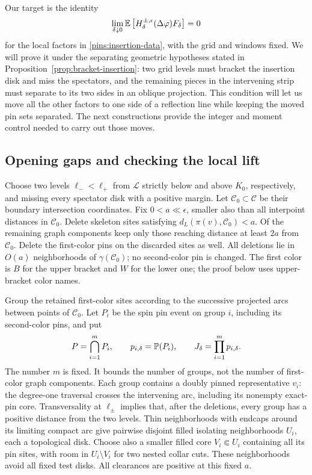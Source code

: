 Our target is the identity
\begin{equation}\label{eq:bracket-insertion}
 \lim_{\delta\downarrow0}
 \mathbb E\left[H_\delta^{\pm,\epsilon}(\Delta\varphi)
                       F_\delta\right]=0
\end{equation}
for the local factors in \eqref{pins:insertion-data}, with the grid and
windows fixed.  We will prove it under the separating geometric
hypotheses stated in Proposition~\ref{prop:bracket-insertion}: two grid
levels must bracket the insertion disk and miss the spectators, and the
remaining pieces in the intervening strip must separate to its two
sides in an oblique projection.  This condition will let us move all the
other factors to one side of a reflection line while keeping the moved
pin sets separated.  The next constructions provide the
integer and moment control needed to carry out those moves.

\subsection{Opening gaps and checking the local lift}

Choose two levels $\ell_-<\ell_+$ from $\mathcal L$ strictly below and
above $K_0$, respectively, and missing every spectator disk with a
positive margin.  Let $\mathcal C_0\subset\mathcal C$ be their boundary
intersection coordinates.  Fix $0<a\ll\epsilon$, smaller also than all
interpoint distances in $\mathcal C_0$.  Delete skeleton sites satisfying
$d_L(\pi(v),\mathcal C_0)<a$.  Of the remaining graph components keep
only those reaching distance at least $2a$ from $\mathcal C_0$.  Delete
the first-color pins on the discarded sites as well.  All deletions
lie in $O(a)$ neighborhoods of $\gamma(\mathcal C_0)$; no second-color
pin is changed.  The first color is $B$ for the upper bracket and $W$
for the lower one; the proof below uses upper-bracket color names.

Group the retained first-color sites according to the successive
projected arcs between points of $\mathcal C_0$.  Let $P_i$ be the spin
pin event on group $i$, including its second-color pins, and put
\begin{equation}\label{pins:rare-normalization}
 P=\bigcap_{i=1}^m P_i,\qquad p_{i,\delta}=\mathbb P(P_i),\qquad
 J_\delta=\prod_{i=1}^m p_{i,\delta}.
\end{equation}
The number $m$ is fixed.  It bounds the number of groups, not the number
of first-color graph components.  Each group contains a doubly pinned
representative $v_i$: the degree-one traversal crosses the intervening
arc, including its nonempty exact-pin core.  Transversality at
$\ell_\pm$ implies that, after the deletions, every group has a
positive distance from the two levels.  Thin neighborhoods with endcaps
around its limiting compact arc give pairwise disjoint filled isolating
neighborhoods $U_i$, each a topological disk.  Choose also a smaller
filled core $V_i\Subset U_i$ containing all its pin sites, with room
in $U_i\setminus V_i$ for two nested collar cuts.  These neighborhoods
avoid all fixed test disks.  All clearances are positive at this fixed
$a$.

